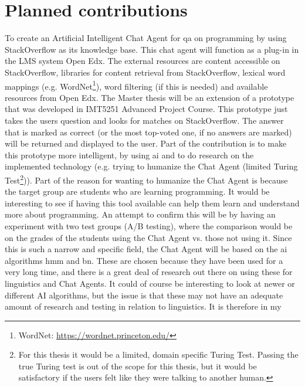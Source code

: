 \section{Planned contributions}
\label{chapter2:planned_contribution}
To create an Artificial Intelligent Chat Agent for \gls{qa} on programming by using StackOverflow as its knowledge base. This chat agent will function as a plug-in in the LMS system 
Open Edx. The external resources are content accessible on StackOverflow, libraries for content retrieval from StackOverflow, lexical word mappings (e.g. WordNet\footnote{WordNet: 
\url{https://wordnet.princeton.edu/}}), word filtering (if this is needed) and available resources from Open Edx.
\vspace{0.5em}\newline
The Master thesis will be an extension of a prototype that was developed in IMT5251 Advanced Project Course. This prototype just takes the users question and looks for matches 
on StackOverflow. The answer that is marked as correct (or the most top-voted one, if no answers are marked) will be returned and displayed to the user. Part of the contribution 
is to make this prototype more intelligent, by using \gls{ai} and to do research on the implemented technology (e.g. trying to humanize the Chat Agent (limited Turing Test\footnote{
	For this thesis it would be a limited, domain specific Turing Test. Passing the true Turing test is out of the scope for this thesis, but it would be satisfactory 
	if the users felt like they were talking to another human.})). Part of the reason for wanting to humanize the Chat Agent is because the target group are students who are 
learning programming. It would be interesting to see if having this tool available can help them learn and understand more about programming. An attempt to confirm this will be 
by having an experiment with two test groups (A/B testing), where the comparison would be on the grades of the students using the Chat Agent vs. those not using it. 
\vspace{0.5em}\newline
Since this is such a narrow and specific field, the Chat Agent will be based on the \gls{ai} algorithms  \gls{hmm} and \gls{bn}. These are chosen 
because they have been used for a very long time, and there is a great deal of research out there on using these for linguistics and Chat Agents. It could of course be interesting 
to look at newer or different AI algorithms, but the issue is that these may not have an adequate amount of research and testing in relation to linguistics. It is therefore in my 
